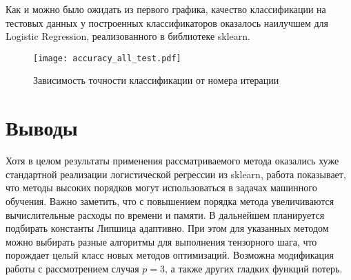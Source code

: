 \documentclass[12pt,twoside]{article}
\begin{document}
	Как и можно было ожидать из первого графика, качество классификации на тестовых данных у построенных классификаторов оказалось наилучшем для Logistic Regression, реализованного в библиотеке sklearn.
	\begin{figure}[h]
	\begin{center}
		\caption{Зависимость точности классификации от номера итерации}
		\texttt{[image: accuracy\_all\_test.pdf]}
	\end{center}
	\end{figure}
	\section{Выводы}
	Хотя в целом результаты применения рассматриваемого метода оказались хуже стандартной реализации логистической регрессии из sklearn, работа показывает, что методы высоких порядков могут использоваться в задачах машинного обучения. Важно заметить, что с повышением порядка метода увеличиваются вычислительные расходы по времени и памяти. В дальнейшем планируется подбирать константы Липшица адаптивно. При этом для указанных методом можно выбирать разные алгоритмы для выполнения тензорного шага, что порождает целый класс новых методов оптимизаций. Возможна модификация работы с рассмотрением случая $p = 3$, а также других гладких функций потерь.
\end{document}
